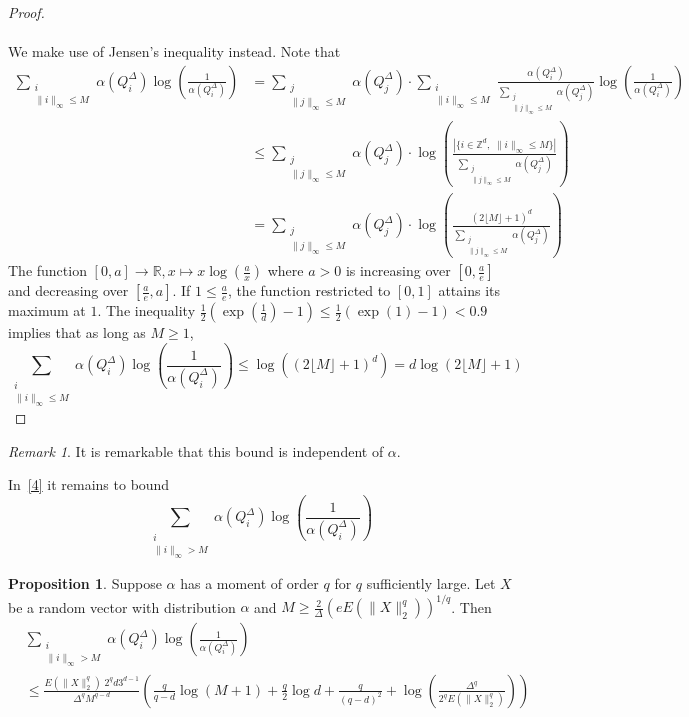 \documentclass[12pt]{report}
\theoremstyle{definition}
\newtheorem{prop}[defi]{Proposition}
\theoremstyle{remark}
\newtheorem{rem}[defi]{Remark}
\begin{document}
\begin{proof}
\\
\\
We make use of Jensen's inequality instead. Note that 
$$\begin{aligned}
\sum_{\substack{i\\ \|i\|_\infty\leq M}} \alpha(Q_i^\Delta)\log\left(\frac{1}{\alpha(Q_i^\Delta)}\right) 
&= \sum_{\substack{j\\ \|j\|_\infty\leq M}} \alpha(Q_j^\Delta) \cdot  \sum_{\substack{i\\ \|i\|_\infty\leq M}} \frac{\alpha(Q_i^\Delta)}{
\sum \limits_{\substack{j\\ \|j\|_\infty\leq M}} \alpha(Q_j^\Delta)
}\log\left(\frac{1}{\alpha(Q_i^\Delta)}\right) \\ 
&\leq \sum_{\substack{j\\ \|j\|_\infty\leq M}} \alpha(Q_j^\Delta) \cdot \log\left(\frac{|\{i\in \mathbb Z^d,\; \|i\|_\infty\leq M \}|}{\sum \limits_{\substack{j\\ \|j\|_\infty\leq M}} \alpha(Q_j^\Delta)}\right)\\
&= \sum_{\substack{j\\ \|j\|_\infty\leq M}} \alpha(Q_j^\Delta) \cdot \log\left(\frac{(2\lfloor M \rfloor + 1)^d}{\sum \limits_{\substack{j\\ \|j\|_\infty\leq M}} \alpha(Q_j^\Delta)}\right)
\end{aligned}
$$
The function $[0,a]\to \mathbb R, x\mapsto x \log\left(\frac{a}{x} \right)$ where $a>0$ is increasing over $[0, \frac ae]$ and decreasing over $[\frac ae , a]$. If $1\leq \frac ae$, the function restricted to $[0,1]$ attains its maximum at $1$. The inequality $\frac 12 \left(\exp(\frac 1d)-1 \right)\leq \frac 12 \left(\exp(1)-1 \right)<0.9$ implies that as long as $M\geq 1$, 
$$\sum_{\substack{i\\ \|i\|_\infty\leq M}} \alpha(Q_i^\Delta)\log\left(\frac{1}{\alpha(Q_i^\Delta)}\right) \leq \log((2\lfloor M \rfloor + 1)^d) = d\log(2\lfloor M \rfloor + 1)$$
\end{proof}

\begin{rem}
It is remarkable that this bound is independent of $\alpha$.
\end{rem}

In~\eqref{4} it remains to bound $$\sum_{\substack{i\\ \|i\|_\infty > M}} \alpha(Q_i^\Delta)\log\left(\frac{1}{\alpha(Q_i^\Delta)}\right)$$

\begin{prop}
	Suppose $\alpha$ has a moment of order $q$ for $q$ sufficiently large. Let $X$ be a random vector with distribution $\alpha$ and $\displaystyle M\geq \frac{2}{\Delta}\left(eE(\|X\|_2^q) \right)^{1/q}$. Then 
\begin{align*}
&\sum_{\substack{i\\ \|i\|_\infty > M}} \alpha(Q_i^\Delta)\log\left(\frac{1}{\alpha(Q_i^\Delta)}\right)\\
&\leq 
\frac{E(\|X\|_2^q)\; 2^q d 3^{d-1}}{\Delta^qM^{q-d}}
\left(
\frac{q}{q-d} \log(M+1) + \frac{q}{2} \log d + \frac{q}{(q-d)^2} + \log\left(\frac{\Delta^q}{2^q E(\|X\|_2^q)} \right)
\right) 
\end{align*}
\end{prop}
\end{document}
